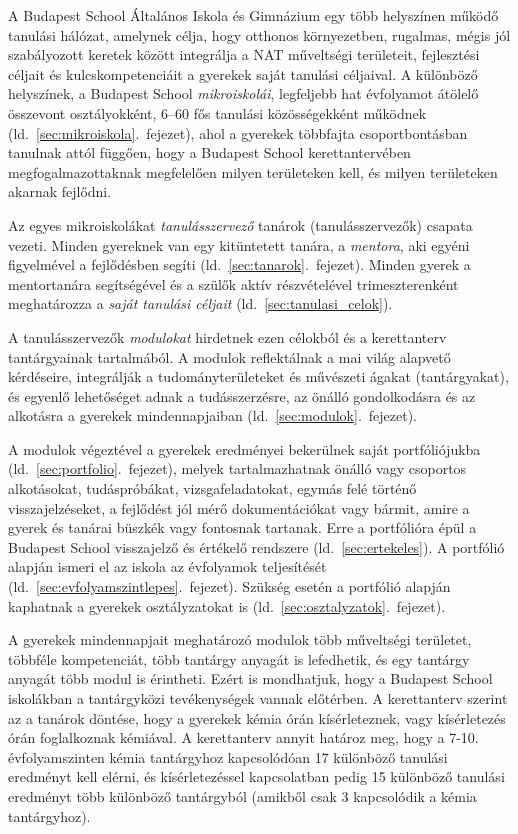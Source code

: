 A Budapest School Általános Iskola és Gimnázium egy több helyszínen működő tanulási hálózat, amelynek célja, hogy otthonos környezetben, rugalmas, mégis jól szabályozott keretek között integrálja a NAT műveltségi területeit, fejlesztési céljait és kulcskompetenciáit a gyerekek saját tanulási céljaival. A különböző helyszínek, a Budapest School \emph{mikroiskolái}, legfeljebb hat évfolyamot átölelő összevont osztályokként, 6--60 fős tanulási közösségekként működnek (ld.~\ref{sec:mikroiskola}.~fejezet), ahol a gyerekek többfajta csoportbontásban tanulnak attól függően, hogy a Budapest School kerettantervében megfogalmazottaknak megfelelően milyen területeken kell, és milyen területeken akarnak fejlődni.

Az egyes mikroiskolákat \emph{tanulásszervező} tanárok (tanulásszervezők) csapata vezeti. Minden gyereknek van egy kitüntetett tanára, a \emph{mentora}, aki egyéni figyelmével a fejlődésben segíti (ld.~\ref{sec:tanarok}.~fejezet). Minden gyerek a mentortanára segítségével és a szülők aktív részvételével trimeszterenként meghatározza a \emph{saját tanulási céljait}
(ld.~\ref{sec:tanulasi_celok}).

A tanulásszervezők \emph{modulokat} hirdetnek ezen célokból és a kerettanterv tantárgyainak tartalmából. A modulok reflektálnak a mai világ alapvető kérdéseire, integrálják	a tudományterületeket és művészeti ágakat (tantárgyakat), és egyenlő lehetőséget adnak a tudásszerzésre, az önálló gondolkodásra és az alkotásra a gyerekek mindennapjaiban 
(ld.~\ref{sec:modulok}.~fejezet).

A modulok végeztével a gyerekek eredményei bekerülnek saját portfóliójukba (ld.~\ref{sec:portfolio}.~fejezet), melyek tartalmazhatnak önálló vagy csoportos alkotásokat, tudáspróbákat, vizsgafeladatokat, egymás felé történő visszajelzéseket, a fejlődést jól mérő dokumentációkat vagy bármit, amire a gyerek és tanárai büszkék vagy fontosnak tartanak. Erre a portfólióra épül a Budapest School visszajelző és értékelő rendszere (ld.~\ref{sec:ertekeles}). A portfólió alapján ismeri el az iskola az évfolyamok teljesítését (ld.~\ref{sec:evfolyamszintlepes}.~fejezet). Szükség esetén a portfólió alapján kaphatnak a gyerekek osztályzatokat is (ld.~\ref{sec:osztalyzatok}.~fejezet).

A gyerekek mindennapjait meghatározó modulok több műveltségi területet, többféle kompetenciát, több tantárgy anyagát is lefedhetik, és egy tantárgy anyagát több modul is érintheti.
Ezért is mondhatjuk, hogy a Budapest School iskolákban a tantárgyközi tevékenységek vannak előtérben. A kerettanterv szerint az a tanárok döntése, hogy a gyerekek kémia órán kísérleteznek, vagy kísérletezés órán foglalkoznak kémiával. A kerettanterv annyit határoz meg, hogy  a 7-10. évfolyamszinten kémia tantárgyhoz kapcsolódóan 17 különböző tanulási eredményt kell elérni, és kísérletezéssel kapcsolatban pedig 15 különböző tanulási eredményt több különböző tantárgyból (amikből csak 3 kapcsolódik a kémia tantárgyhoz).

